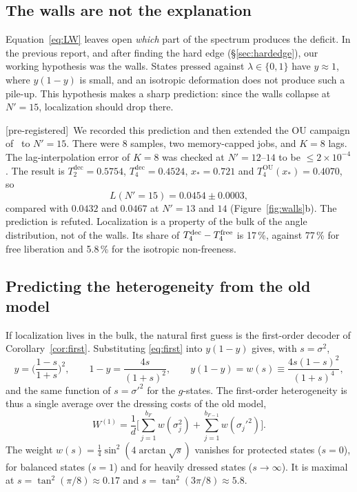 \documentclass[11pt]{article}
\newcommand{\Np}{N'}
\newcommand{\dec}{\mathrm{dec}}
\newcommand{\OU}{\mathrm{OU}}
\newcommand{\Wone}{W^{(1)}}
\newcommand{\tagbox}[2]{\textsf{\small\color{#1}[#2]}}
\newcommand{\PRE}{\tagbox{cnum}{pre-registered}}
\theoremstyle{plain}
\theoremstyle{remark}
\numberwithin{equation}{section}
\begin{document}
\subsection{The walls are not the explanation}\label{sec:walls-refuted}

Equation~\eqref{eq:LW} leaves open \emph{which} part of the spectrum produces the deficit. In the previous report, and
after finding the hard edge (\S\ref{sec:hardedge}), our working hypothesis was the walls. States pressed against
$\lambda\in\{0,1\}$ have $y\approx1$, where $y(1-y)$ is small, and an isotropic deformation does not produce such a pile-up.
This hypothesis makes a sharp prediction: since the walls collapse at $\Np=15$, localization should drop there.

\PRE\ We recorded this prediction and then extended the OU campaign of~\cite{prog1005} to $\Np=15$. There were 8
samples, two memory-capped jobs, and $K=8$ lags. The lag-interpolation error of $K=8$ was checked at $\Np=12$--$14$ to be
$\le2\times10^{-4}$. The result is $T_2^\dec=0.5754$, $T_4^\dec=0.4524$, $x_*=0.721$ and $T_4^\OU(x_*)=0.4070$, so
\[
L(\Np=15)=0.0454\pm0.0003,
\]
compared with $0.0432$ and $0.0467$ at $\Np=13$ and $14$ (Figure~\ref{fig:walls}b). The prediction is refuted.
Localization is a property of the bulk of the angle distribution, not of the walls. Its share of $T_4^\dec-T_4^{\rm free}$ is
17\,\%, against 77\,\% for free liberation and 5.8\,\% for the isotropic non-freeness.

\subsection{Predicting the heterogeneity from the old model}\label{sec:prediction}

If localization lives in the bulk, the natural first guess is the first-order decoder of
Corollary~\ref{cor:first}. Substituting \eqref{eq:first} into $y(1-y)$ gives, with $s=\sigma^2$,
\[
y=\Big(\frac{1-s}{1+s}\Big)^2,\qquad 1-y=\frac{4s}{(1+s)^2},\qquad
y(1-y)=w(s)\equiv\frac{4s(1-s)^2}{(1+s)^4},
\]
and the same function of $s=\sigma'^2$ for the $g$-states. The first-order heterogeneity is thus a single average over
the dressing costs of the old model,
\begin{equation}\label{eq:W1}
\Wone=\frac1d\Big[\sum_{j=1}^{b_F}w(\sigma_j^2)+\sum_{j=1}^{b_{F-1}}w(\sigma_j'^2)\Big].
\end{equation}
The weight $w(s)=\tfrac14\sin^2(4\arctan\sqrt s)$ vanishes for protected states ($s=0$), for balanced states ($s=1$) and
for heavily dressed states ($s\to\infty$). It is maximal at $s=\tan^2(\pi/8)\approx0.17$ and $s=\tan^2(3\pi/8)\approx5.8$.
\end{document}

